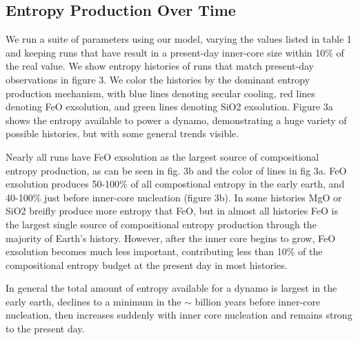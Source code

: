 \documentclass[]{article}
\begin{document}
	\subsection{Entropy Production Over Time}\label{entropy-production-over-time}
	We run a suite of parameters using our model, varying the values listed in table 1 and keeping runs that have result in a present-day inner-core size within
	10\% of the real value. We show entropy histories of runs that match present-day observations in figure 3. We color the histories by the dominant entropy production mechanism, with blue lines denoting secular cooling, red lines denoting FeO exsolution, and green lines denoting SiO2 exsolution. Figure 3a shows the entropy available to power a dynamo, demonstrating a huge variety of possible histories, but with some general trends visible. 
	
	Nearly all runs have FeO exsolution as the largest source of compositional entropy production, as can be seen in fig. 3b and the color of lines in fig 3a. 
	FeO exsolution produces 50-100\% of all compostional entropy in the early earth, and 40-100\% just before inner-core nucleation (figure 3b). In some histories MgO or SiO2 breifly produce more entropy that FeO, but in almost all histories FeO is the largest single source of compositional entropy production through the majority of Earth's history. However, after the inner core begins to grow, FeO
	exsolution becomes much less important, contributing less than 10\% of
	the compositional entropy budget at the present day in most histories.

	In general the total amount of entropy available for a dynamo is largest in the early earth, declines to a minimum in the $\sim$  billion years before inner-core nucleation, then increases suddenly with inner core nucleation and remains strong to the present day. 
	
\end{document}
